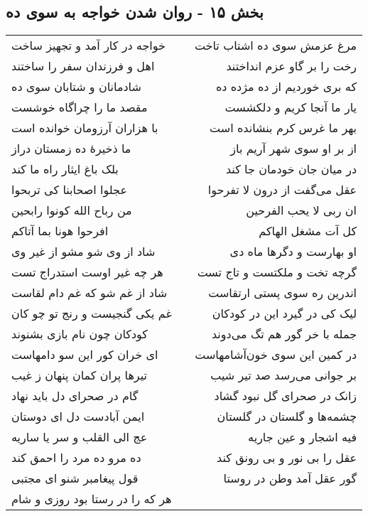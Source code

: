 \begin{center}
\section*{بخش ۱۵ - روان شدن خواجه به سوی ده}
\label{sec:sh015}
\begin{longtable}{l p{0.5cm} r}
خواجه در کار آمد و تجهیز ساخت
&&
مرغ عزمش سوی ده اشتاب تاخت
\\
اهل و فرزندان سفر را ساختند
&&
رخت را بر گاو عزم انداختند
\\
شادمانان و شتابان سوی ده
&&
که بری خوردیم از ده مژده ده
\\
مقصد ما را چراگاه خوشست
&&
یار ما آنجا کریم و دلکشست
\\
با هزاران آرزومان خوانده است
&&
بهر ما غرس کرم بنشانده است
\\
ما ذخیرهٔ ده زمستان دراز
&&
از بر او سوی شهر آریم باز
\\
بلک باغ ایثار راه ما کند
&&
در میان جان خودمان جا کند
\\
عجلوا اصحابنا کی تربحوا
&&
عقل می‌گفت از درون لا تفرحوا
\\
من رباح الله کونوا رابحین
&&
ان ربی لا یحب الفرحین
\\
افرحوا هونا بما آتاکم
&&
کل آت مشغل الهاکم
\\
شاد از وی شو مشو از غیر وی
&&
او بهارست و دگرها ماه دی
\\
هر چه غیر اوست استدراج تست
&&
گرچه تخت و ملکتست و تاج تست
\\
شاد از غم شو که غم دام لقاست
&&
اندرین ره سوی پستی ارتقاست
\\
غم یکی گنجیست و رنج تو چو کان
&&
لیک کی در گیرد این در کودکان
\\
کودکان چون نام بازی بشنوند
&&
جمله با خر گور هم تگ می‌دوند
\\
ای خران کور این سو دامهاست
&&
در کمین این سوی خون‌آشامهاست
\\
تیرها پران کمان پنهان ز غیب
&&
بر جوانی می‌رسد صد تیر شیب
\\
گام در صحرای دل باید نهاد
&&
زانک در صحرای گل نبود گشاد
\\
ایمن آبادست دل ای دوستان
&&
چشمه‌ها و گلستان در گلستان
\\
عج الی القلب و سر یا ساریه
&&
فیه اشجار و عین جاریه
\\
ده مرو ده مرد را احمق کند
&&
عقل را بی نور و بی رونق کند
\\
قول پیغامبر شنو ای مجتبی
&&
گور عقل آمد وطن در روستا
\\
هر که را در رستا بود روزی و شام

\end{longtable}
\end{center}
